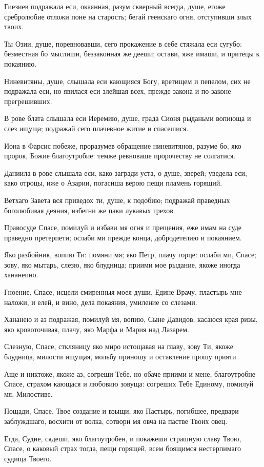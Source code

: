 Гиезиев подражала еси, окаянная, разум скверный всегда, душе, егоже сребролюбие отложи поне на старость; бегай геенскаго огня, отступивши злых твоих.

Ты Озии, душе, поревновавши, сего прокажение в себе стяжала еси сугубо: безместная бо мыслиши, беззаконная же дееши; остави, яже имаши, и притецы к покаянию.

Ниневитяны, душе, слышала еси кающияся Богу, вретищем и пепелом, сих не подражала еси, но явилася еси злейшая всех, прежде закона и по законе прегрешивших.

В рове блата слышала еси Иеремию, душе, града Сионя рыданьми вопиюща и слез ищуща; подражай сего плачевное житие и спасешися.

Иона в Фарсис побеже, проразумев обращение ниневитянов, разуме бо, яко пророк, Божие благоутробие: темже ревноваше пророчеству не солгатися.

Даниила в рове слышала еси, како загради уста, о душе, зверей; уведела еси, како отроцы, иже о Азарии, погасиша верою пещи пламень горящий.

Ветхаго Завета вся приведох ти, душе, к подобию; подражай праведных боголюбивая деяния, избегни же паки лукавых грехов.

Правосуде Спасе, помилуй и избави мя огня и прещения, еже имам на суде праведно претерпети; ослаби ми прежде конца, добродетелию и покаянием.

Яко разбойник, вопию Ти: помяни мя; яко Петр, плачу горце: ослаби ми, Спасе; зову, яко мытарь, слезю, яко блудница; приими мое рыдание, якоже иногда хананеино.

Гноение, Спасе, исцели смиренныя моея души, Едине Врачу, пластырь мне наложи, и елей, и вино, дела покаяния, умиление со слезами.

Хананею и аз подражая, помилуй мя, вопию, Сыне Давидов; касаюся края ризы, яко кровоточивая, плачу, яко Марфа и Мария над Лазарем.

Слезную, Спасе, сткляницу яко миро истощавая на главу, зову Ти, якоже блудница, милости ищущая, мольбу приношу и оставление прошу прияти.

Аще и никтоже, якоже аз, согреши Тебе, но обаче приими и мене, благоутробне Спасе, страхом кающася и любовию зовуща: согреших Тебе Единому, помилуй мя, Милостиве.

Пощади, Спасе, Твое создание и взыщи, яко Пастырь, погибшее, предвари заблуждшаго, восхити от волка, сотвори мя овча на пастве Твоих овец.

Егда, Судие, сядеши, яко благоутробен, и покажеши страшную славу Твою, Спасе, о каковый страх тогда, пещи горящей, всем боящимся нестерпимаго судища Твоего.

